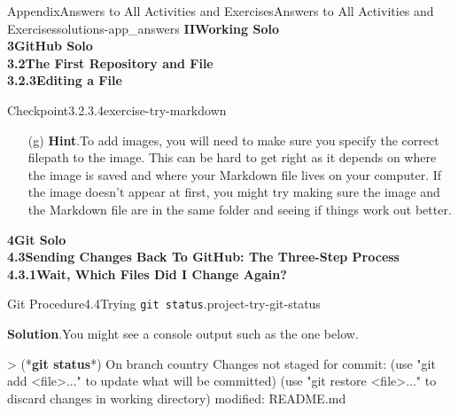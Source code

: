 \documentclass[twoside,10pt,]{book}
\newcommand{\blocktitlefont}{\relax}
\newcommand{\mono}[1]{\texttt{#1}}
\newcommand{\consoleinput}[1]{\textbf{#1}}
\begin{document}
\begin{solutions-chapter}{Appendix}{Answers to All Activities and Exercises}{}{Answers to All Activities and Exercises}{}{}{solutions-app_answers}
\noindent\textbf{\Large{}II\space\textperiodcentered\space{}Working Solo\\
3\space\textperiodcentered\space{}GitHub Solo\\
3.2\space\textperiodcentered\space{}The First Repository and File\\
3.2.3\space\textperiodcentered\space{}Editing a File}
\begin{inlinesolution}{Checkpoint}{3.2.3.4}{}{exercise-try-markdown}%
\begin{enumerate}[font=\bfseries,label=(\alph*),ref=\alph*]%
\item[(g)]\noindent\textbf{\blocktitlefont Hint}.\hypertarget{hint-try-markdown-i-b-back}{}\quad{}To add images, you will need to make sure you specify the correct filepath to the image. This can be hard to get right as it depends on where the image is saved and where your Markdown file lives on your computer. If the image doesn't appear at first, you might try making sure the image and the Markdown file are in the same folder and seeing if things work out better.%
\end{enumerate}%
\end{inlinesolution}%
\par\medskip
\noindent\textbf{\Large{}4\space\textperiodcentered\space{}Git Solo\\
4.3\space\textperiodcentered\space{}Sending Changes Back To GitHub: The Three-Step Process\\
4.3.1\space\textperiodcentered\space{}Wait, Which Files Did I Change Again?}
\begin{projectsolution}{Git Procedure}{4.4}{Trying \mono{git status}.}{project-try-git-status}%
\par\smallskip%
\noindent\textbf{\blocktitlefont Solution}.\hypertarget{solution-try-git-status-e-back}{}\quad{}You might see a console output such as the one below.%
\begin{console}{0}{1}{0}
> (*\consoleinput{git status}*)
On branch country
Changes not staged for commit:
  (use "git add <file>..." to update what will be committed)
  (use "git restore <file>..." to discard changes in working directory)
        modified:   README.md


\end{console}
\end{projectsolution}
\end{solutions-chapter}
\end{document}
